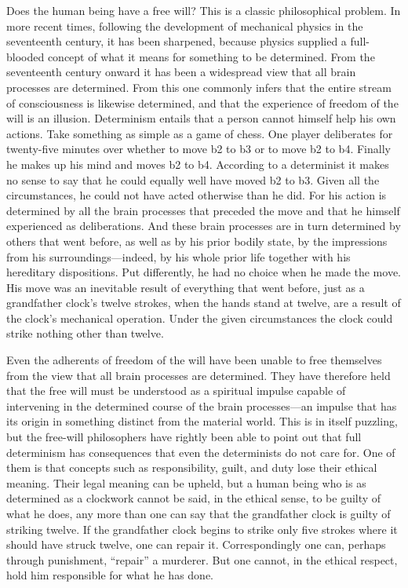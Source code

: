 \documentclass[12pt,a4paper]{book}
\begin{document}
Does the human being have a free will? This is a classic philosophical problem. In more recent times, following the development of mechanical physics in the seventeenth century, it has been sharpened, because physics supplied a full-blooded concept of what it means for something to be determined. From the seventeenth century onward it has been a widespread view that all brain processes are determined. From this one commonly infers that the entire stream of consciousness is likewise determined, and that the experience of freedom of the will is an illusion. Determinism entails that a person cannot himself help his own actions. Take something as simple as a game of chess. One player deliberates for twenty-five minutes over whether to move b2 to b3 or to move b2 to b4. Finally he makes up his mind and moves b2 to b4. According to a determinist it makes no sense to say that he could equally well have moved b2 to b3. Given all the circumstances, he could not have acted otherwise than he did. For his action is determined by all the brain processes that preceded the move and that he himself experienced as deliberations. And these brain processes are in turn determined by others that went before, as well as by his prior bodily state, by the impressions from his surroundings---indeed, by his whole prior life together with his hereditary dispositions. Put differently, he had no choice when he made the move. His move was an inevitable result of everything that went before, just as a grandfather clock's twelve strokes, when the hands stand at twelve, are a result of the clock's mechanical operation. Under the given circumstances the clock could strike nothing other than twelve.

Even the adherents of freedom of the will have been unable to free themselves from the view that all brain processes are determined. They have therefore held that the free will must be understood as a spiritual impulse capable of intervening in the determined course of the brain processes---an impulse that has its origin in something distinct from the material world. This is in itself puzzling, but the free-will philosophers have rightly been able to point out that full determinism has consequences that even the determinists do not care for. One of them is that concepts such as responsibility, guilt, and duty lose their ethical meaning. Their legal meaning can be upheld, but a human being who is as determined as a clockwork cannot be said, in the ethical sense, to be guilty of what he does, any more than one can say that the grandfather clock is guilty of striking twelve. If the grandfather clock begins to strike only five strokes where it should have struck twelve, one can repair it. Correspondingly one can, perhaps through punishment, ``repair'' a murderer. But one cannot, in the ethical respect, hold him responsible for what he has done.
\end{document}

